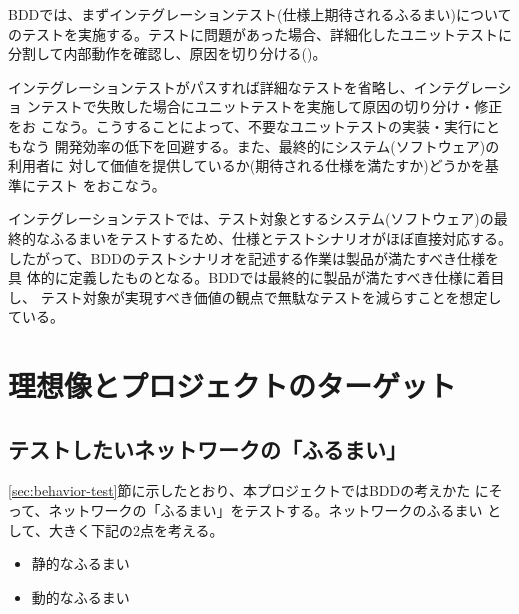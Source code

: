 BDDでは、まずインテグレーションテスト(仕様上期待されるふるまい)について
のテストを実施する。テストに問題があった場合、詳細化したユニットテストに
分割して内部動作を確認し、原因を切り分ける()。

インテグレーションテストがパスすれば詳細なテストを省略し、インテグレーショ
ンテストで失敗した場合にユニットテストを実施して原因の切り分け・修正をお
こなう。こうすることによって、不要なユニットテストの実装・実行にともなう
開発効率の低下を回避する。また、最終的にシステム(ソフトウェア)の利用者に
対して価値を提供しているか(期待される仕様を満たすか)どうかを基準にテスト
をおこなう。

インテグレーションテストでは、テスト対象とするシステム(ソフトウェア)の最
終的なふるまいをテストするため、仕様とテストシナリオがほぼ直接対応する。
したがって、BDDのテストシナリオを記述する作業は製品が満たすべき仕様を具
体的に定義したものとなる。BDDでは最終的に製品が満たすべき仕様に着目し、
テスト対象が実現すべき価値の観点で無駄なテストを減らすことを想定している。

 \section{理想像とプロジェクトのターゲット}
 \label{sec:desired-and-target}


  \subsection{テストしたいネットワークの「ふるまい」}
  \label{sec:behavior-to-test}

\ref{sec:behavior-test}節に示したとおり、本プロジェクトではBDDの考えかた
にそって、ネットワークの「ふるまい」をテストする。ネットワークのふるまい
として、大きく下記の2点を考える。
\begin{itemize}
 \item 静的なふるまい
 \item 動的なふるまい
\end{itemize}

